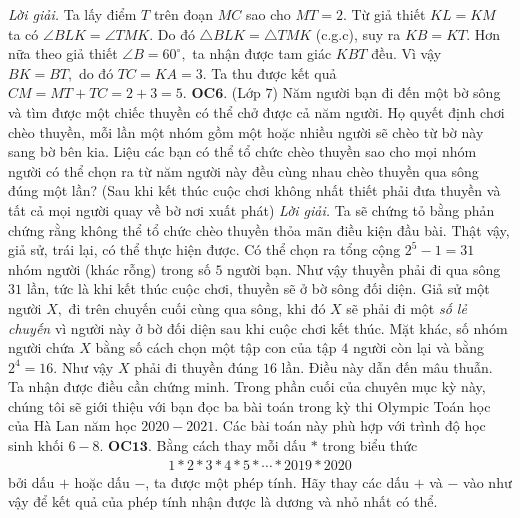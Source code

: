 \begin{multicols}{2}
\begin{figure}[H]
		\vspace*{-5pt}
	\end{figure}
	\textit{Lời giải.} 
	Ta lấy điểm $T$ trên đoạn $MC$ sao cho $MT=2.$ Từ giả thiết $KL=KM$ ta có $\angle BLK= \angle TMK.$ Do đó $\triangle BLK = \triangle TMK $ (c.g.c), suy ra $KB=KT.$ Hơn nữa theo giả thiết $\angle B=60^\circ,$ ta nhận được tam giác $KBT$ đều. Vì vậy $BK=BT,$ do đó $TC=KA=3.$ Ta thu được kết quả $CM= MT + TC=2+3=5.$ 
	\vskip 0.1cm	
	{\bf\color{cackithi} OC$\pmb{6.}$} (Lớp $7$) Năm người bạn đi đến một bờ sông và tìm được một chiếc thuyền có thể chở được cả năm người. Họ quyết định chơi chèo thuyền, mỗi lần một nhóm gồm một hoặc nhiều người sẽ chèo từ bờ này sang bờ bên kia. Liệu các bạn có thể tổ chức chèo thuyền sao cho mọi nhóm người có thể chọn ra từ năm người này đều cùng nhau chèo thuyền qua sông đúng một lần? (Sau khi kết thúc cuộc chơi không nhất thiết phải đưa thuyền và tất cả mọi người quay về bờ nơi xuất phát)
	\vskip 0.1cm
	\textit{Lời giải.} Ta sẽ chứng tỏ bằng phản chứng rằng không thể tổ chức chèo thuyền thỏa mãn điều kiện đầu bài. 
	Thật vậy, giả sử, trái lại, có thể thực hiện được. 
	\vskip 0.1cm
	Có thể chọn ra tổng cộng $2^5-1=31$ nhóm người (khác rỗng)  trong số $5$ người bạn. Như vậy thuyền phải đi qua sông $31$ lần, tức là khi kết thúc cuộc chơi, thuyền sẽ ở bờ sông đối diện.  Giả sử một người $X,$ đi trên chuyến cuối cùng qua sông, khi đó $X$ sẽ phải đi một {\it số lẻ chuyến} vì người này ở bờ đối diện sau khi cuộc chơi kết thúc.
	\vskip 0.1cm
	Mặt khác, số nhóm người chứa $X$ bằng số cách chọn một tập con của tập $4$ người còn lại và bằng $2^4=16.$ Như vậy $X$ phải đi thuyền đúng $16$ lần. Điều này dẫn đến mâu thuẫn. Ta nhận được điều cần chứng minh.  
	\vskip 0.1cm
	Trong phần cuối của chuyên mục kỳ này, chúng tôi sẽ giới thiệu với bạn đọc ba bài toán trong kỳ thi Olympic Toán học của Hà Lan năm học $2020-2021$. Các bài toán này phù hợp với trình độ học sinh khối $6-8$.
	\vskip 0.1cm
	{\bf\color{cackithi} OC$\pmb{13.}$} Bằng cách thay mỗi dấu $\ast$ trong biểu thức 
	\begin{align*}
		1 \ast  2 \ast 3  \ast 4 \ast 5 \ast \cdots \ast 2019 \ast 2020
	\end{align*} bởi dấu $+$ hoặc dấu $-$, ta được một phép tính. Hãy thay các dấu $+$ và $-$ vào như vậy để kết quả của phép tính nhận được là dương và nhỏ nhất có thể.

\end{multicols}
